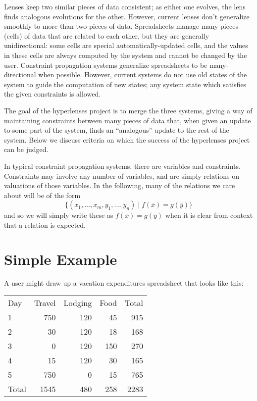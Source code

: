 \documentclass{article}
\begin{document}
Lenses keep two similar pieces of data consistent; as either one evolves,
the lens finds analogous evolutions for the other. However, current lenses
don't generalize smoothly to more than two pieces of data. Spreadsheets
manage many pieces (cells) of data that are related to each other, but they
are generally unidirectional: some cells are special automatically-updated
cells, and the values in these cells are always computed by the system and
cannot be changed by the user. Constraint propagation systems generalize
spreadsheets to be many-directional when possible. However, current systems
do not use old states of the system to guide the computation of new states;
any system state which satisfies the given constraints is allowed.

The goal of the hyperlenses project is to merge the three systems, giving a
way of maintaining constraints between many pieces of data that, when given
an update to some part of the system, finds an ``analogous'' update to the
rest of the system. Below we discuss criteria on which the success of the
hyperlenses project can be judged.

In typical constraint propagation systems, there are variables and
constraints. Constraints may involve any number of variables, and are simply
relations on valuations of those variables. In the following, many of the
relations we care about will be of the form
\[\{(x_1,\ldots,x_m,y_1,\ldots,y_n) \mid f(\overline x) = g(\overline y)\}\]
and so we will simply write these as
$f(\overline x) = g(\overline y)$
when it is clear from context that a relation is expected.

\section{Simple Example}
A user might draw up a vacation expenditures spreadsheet that looks like
this:

\begin{tabular}[h]{lrrrr}
    Day     & Travel    & Lodging   & Food  & Total \\
    1       & 750       & 120       & 45    & 915   \\
    2       & 30        & 120       & 18    & 168   \\
    3       & 0         & 120       & 150   & 270   \\
    4       & 15        & 120       & 30    & 165   \\
    5       & 750       & 0         & 15    & 765   \\
    Total   & 1545      & 480       & 258   & 2283  \\
\end{tabular}
\end{document}
